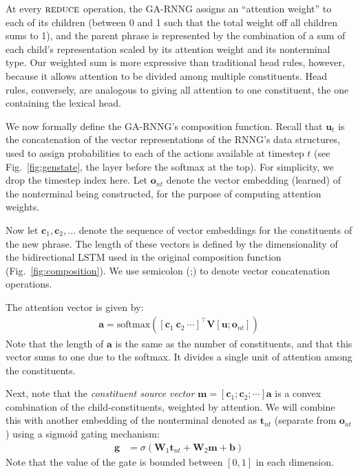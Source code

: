 \documentclass[11pt]{article}
\begin{document}
At every $\textsc{reduce}$ operation, the GA-RNNG assigns an ``attention weight'' to each of its children (between 0 and 1 such that the total weight off all children sums to 1), and the parent phrase is represented by the combination of a sum of each child's representation scaled by its attention weight and its nonterminal type. Our weighted sum is more expressive than traditional head rules, however, because it allows attention to be divided among multiple constituents. Head rules, conversely, are analogous to giving all attention to one constituent, the one containing the lexical head.

We now formally define the GA-RNNG's composition function.
Recall that $\mathbf{u}_t$ is the concatenation of the vector representations of the RNNG's data structures, used to assign probabilities to each of the actions available at timestep $t$ (see Fig.~\ref{fig:genstate}, the layer before the softmax at the top). For simplicity, we drop the timestep index here. Let $\mathbf{o}_{\mathit{nt}}$ denote the vector embedding (learned) of the nonterminal being constructed, for the purpose of computing attention weights. 

Now let $\mathbf{c}_1, \mathbf{c}_2,\ldots$ denote the sequence of vector embeddings for the constituents of the new phrase.  The length of these vectors is defined by the dimensionality of the bidirectional LSTM used in the original composition function (Fig.~\ref{fig:composition}). We use semicolon (;) to denote vector concatenation operations.

The attention vector is given by:
\begin{align}
\mathbf{a} = \mathrm{softmax}\left( \left[ \mathbf{c}_1 \ \mathbf{c}_2 \ \cdots \right]^{\top} \mathbf{V} \left[ \mathbf{u}; \mathbf{o}_{\mathit{nt}} \right]\right)
\end{align}
Note that the length of $\mathbf{a}$ is the same as the number of constituents, and that this vector sums to one due to the softmax.  It divides a single unit of attention among the constituents.







Next, note that the \emph{constituent source vector} $\mathbf{m} = [\mathbf{c}_1 ; \mathbf{c}_2; \cdots ] \mathbf{a}$ is a convex combination of the child-constituents, weighted by attention.  We will combine this with another embedding of the nonterminal denoted as $\mathbf{t}_{\mathit{nt}}$ (separate from $\mathbf{o}_{\mathit{nt}}$) using a sigmoid gating mechanism:
\begin{align}
\mathbf{g} & = \sigma \left( \mathbf{W}_1 \mathbf{t}_{\mathit{nt}} + \mathbf{W}_2 \mathbf{m} + \mathbf{b} \right)
\end{align}
Note that the value of the gate is bounded between $\left[0, 1 \right]$ in each dimension.
\end{document}
